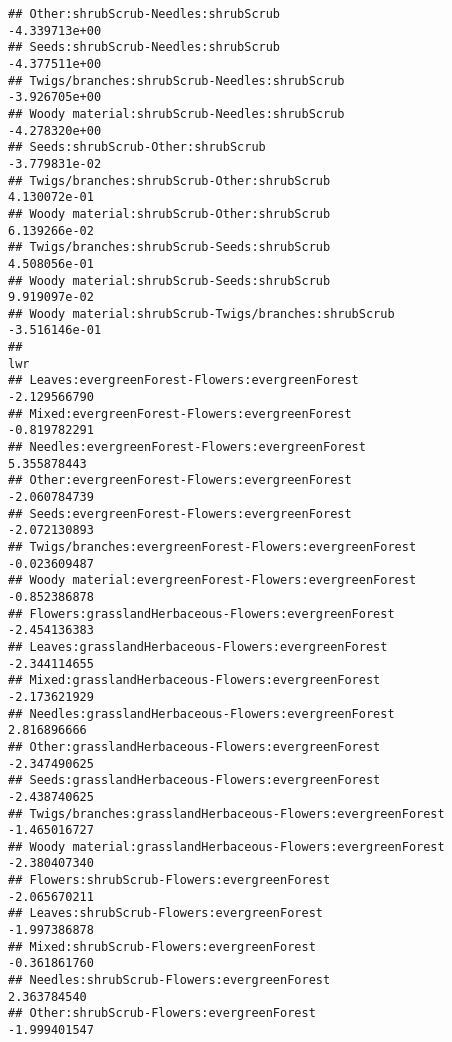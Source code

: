 \documentclass[
]{article}
\begin{document}
\begin{verbatim}
## Other:shrubScrub-Needles:shrubScrub                                   -4.339713e+00
## Seeds:shrubScrub-Needles:shrubScrub                                   -4.377511e+00
## Twigs/branches:shrubScrub-Needles:shrubScrub                          -3.926705e+00
## Woody material:shrubScrub-Needles:shrubScrub                          -4.278320e+00
## Seeds:shrubScrub-Other:shrubScrub                                     -3.779831e-02
## Twigs/branches:shrubScrub-Other:shrubScrub                             4.130072e-01
## Woody material:shrubScrub-Other:shrubScrub                             6.139266e-02
## Twigs/branches:shrubScrub-Seeds:shrubScrub                             4.508056e-01
## Woody material:shrubScrub-Seeds:shrubScrub                             9.919097e-02
## Woody material:shrubScrub-Twigs/branches:shrubScrub                   -3.516146e-01
##                                                                                lwr
## Leaves:evergreenForest-Flowers:evergreenForest                        -2.129566790
## Mixed:evergreenForest-Flowers:evergreenForest                         -0.819782291
## Needles:evergreenForest-Flowers:evergreenForest                        5.355878443
## Other:evergreenForest-Flowers:evergreenForest                         -2.060784739
## Seeds:evergreenForest-Flowers:evergreenForest                         -2.072130893
## Twigs/branches:evergreenForest-Flowers:evergreenForest                -0.023609487
## Woody material:evergreenForest-Flowers:evergreenForest                -0.852386878
## Flowers:grasslandHerbaceous-Flowers:evergreenForest                   -2.454136383
## Leaves:grasslandHerbaceous-Flowers:evergreenForest                    -2.344114655
## Mixed:grasslandHerbaceous-Flowers:evergreenForest                     -2.173621929
## Needles:grasslandHerbaceous-Flowers:evergreenForest                    2.816896666
## Other:grasslandHerbaceous-Flowers:evergreenForest                     -2.347490625
## Seeds:grasslandHerbaceous-Flowers:evergreenForest                     -2.438740625
## Twigs/branches:grasslandHerbaceous-Flowers:evergreenForest            -1.465016727
## Woody material:grasslandHerbaceous-Flowers:evergreenForest            -2.380407340
## Flowers:shrubScrub-Flowers:evergreenForest                            -2.065670211
## Leaves:shrubScrub-Flowers:evergreenForest                             -1.997386878
## Mixed:shrubScrub-Flowers:evergreenForest                              -0.361861760
## Needles:shrubScrub-Flowers:evergreenForest                             2.363784540
## Other:shrubScrub-Flowers:evergreenForest                              -1.999401547

\end{verbatim}
\end{document}
